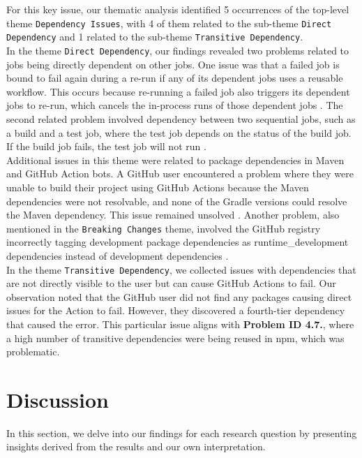 \documentclass[conference]{IEEEtran}
\begin{document}
	For this key issue, our thematic analysis identified 5 occurrences of the top-level theme \texttt{Dependency Issues}, with 4 of them related to the sub-theme \texttt{Direct Dependency} and 1 related to the sub-theme \texttt{Transitive Dependency}.\\
	In the theme \texttt{Direct Dependency}, our findings revealed two problems related to jobs being directly dependent on other jobs. One issue was that a failed job is bound to fail again during a re-run if any of its dependent jobs uses a reusable workflow. This occurs because re-running a failed job also triggers its dependent jobs to re-run, which cancels the in-process runs of those dependent jobs \cite{gvanrossum2024}. The second related problem involved dependency between two sequential jobs, such as a build and a test job, where the test job depends on the status of the build job. If the build job fails, the test job will not run \cite{hugomg2024}.\\
	Additional issues in this theme were related to package dependencies in Maven and GitHub Action bots. A GitHub user encountered a problem where they were unable to build their project using GitHub Actions because the Maven dependencies were not resolvable, and none of the Gradle versions could resolve the Maven dependency. This issue remained unsolved \cite{kxuenvoy2024}. Another problem, also mentioned in the \texttt{Breaking Changes} theme, involved the GitHub registry incorrectly tagging development package dependencies as runtime\_development dependencies instead of development dependencies \cite{nbibler2024}.\\
	In the theme \texttt{Transitive Dependency}, we collected issues with dependencies that are not directly visible to the user but can cause GitHub Actions to fail. Our observation noted that the GitHub user did not find any packages causing direct issues for the Action to fail. However, they discovered a fourth-tier dependency that caused the error. This particular issue aligns with \textbf{Problem ID 4.7.}, where a high number of transitive dependencies were being reused in npm, which was problematic\cite{hugomg22024}.
\section{Discussion}
	In this section, we delve into our findings for each research question by presenting insights derived from the results and our own interpretation.\\
\end{document}
